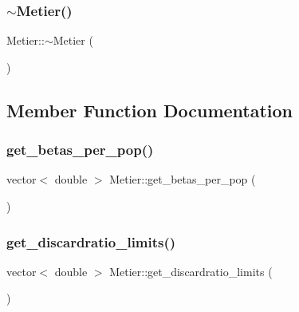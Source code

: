 \mbox{\label{class_metier_a9c20fd76517abece79dadf52cb8e189c}} 
\subsubsection{\texorpdfstring{$\sim$Metier()}{~Metier()}}
{\footnotesize\ttfamily Metier\+::$\sim$\+Metier (\begin{DoxyParamCaption}{ }\end{DoxyParamCaption})}



\subsection{Member Function Documentation}
\mbox{\label{class_metier_a5199057d6e45199dd30ecc74963a28c5}} 
\subsubsection{\texorpdfstring{get\_betas\_per\_pop()}{get\_betas\_per\_pop()}}
{\footnotesize\ttfamily vector$<$ double $>$ Metier\+::get\+\_\+betas\+\_\+per\+\_\+pop (\begin{DoxyParamCaption}{ }\end{DoxyParamCaption})}

\mbox{\label{class_metier_aaaa86cca255c7b6b38d6b372a9895df8}} 
\subsubsection{\texorpdfstring{get\_discardratio\_limits()}{get\_discardratio\_limits()}}
{\footnotesize\ttfamily vector$<$ double $>$ Metier\+::get\+\_\+discardratio\+\_\+limits (\begin{DoxyParamCaption}{ }\end{DoxyParamCaption})}

\mbox{\label{class_metier_ac3c1439e51f18f03eb963a5f5203cc4b}} 
